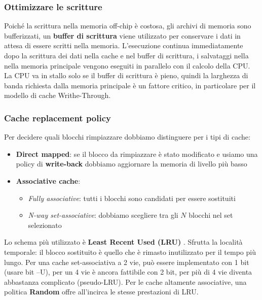 \subsubsection{Ottimizzare le scritture}
Poiché la scrittura nella memoria off-chip è costosa, gli archivi di memoria sono bufferizzati, un \textbf{buffer di scrittura} viene utilizzato per conservare i dati in attesa di essere scritti nella memoria.
L'esecuzione continua immediatamente dopo la scrittura dei dati nella cache e nel buffer di scrittura, i salvataggi nella nella memoria principale vengono eseguiti in parallelo con il calcolo della CPU. 
La CPU va in stallo solo se il buffer di scrittura è pieno, quindi la larghezza di banda richiesta dalla memoria principale è un fattore critico, in particolare per il modello di cache Writhe-Through.

\subsubsection{Cache replacement policy}
Per decidere quali blocchi rimpiazzare dobbiamo distinguere per i tipi di cache:
\begin{itemize}
	\item \textbf{Direct mapped}: se il blocco da rimpiazzare è stato modificato e usiamo una policy di \textbf{write-back} dobbiamo aggiornare la memoria di livello più basso
	\item \textbf{Associative cache}:
	\begin{itemize}
		\item  \emph{Fully associative}: tutti i blocchi sono candidati per essere sostituiti
		\item \emph{N-way set-associative}: dobbiamo scegliere tra gli $N$ blocchi nel set selezionato
	\end{itemize}
\end{itemize}
Lo schema più utilizzato è \textbf{Least Recent Used (LRU)} \label{lru}. Sfrutta la località temporale: il blocco sostituito è quello che è rimasto inutilizzato per il tempo più lungo. 
Per una cache set-associativa a 2 vie, può essere implementato con 1 bit (usare bit --U), per un 4 vie è ancora fattibile con 2 bit, per più di 4 vie diventa abbastanza complicato (pseudo-LRU).
Per le cache altamente associative, una politica \textbf{Random} offre all'incirca le stesse prestazioni di LRU.

